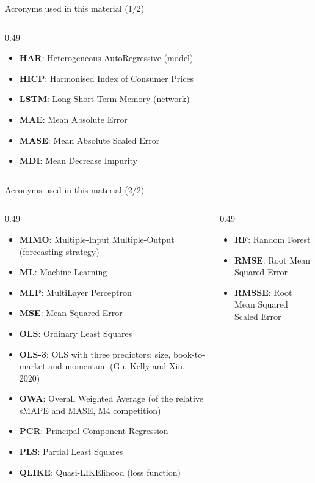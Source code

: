 \begin{frame}{Acronyms used in this material (1/2)}
\begin{columns}[T]
\begin{column}{0.49\textwidth}
\begin{itemize}
    \item \textbf{HAR}: Heterogeneous AutoRegressive (model)
    \item \textbf{HICP}: Harmonised Index of Consumer Prices
    \item \textbf{LSTM}: Long Short-Term Memory (network)
    \item \textbf{MAE}: Mean Absolute Error
    \item \textbf{MASE}: Mean Absolute Scaled Error
    \item \textbf{MDI}: Mean Decrease Impurity
\end{itemize}
\end{column}
\end{columns}
\end{frame}
\begin{frame}{Acronyms used in this material (2/2)}
\begin{columns}[T]
\begin{column}{0.49\textwidth}
\begin{itemize}\setlength{\itemsep}{0pt}
    \item \textbf{MIMO}: Multiple-Input Multiple-Output (forecasting strategy)
    \item \textbf{ML}: Machine Learning
    \item \textbf{MLP}: MultiLayer Perceptron
    \item \textbf{MSE}: Mean Squared Error
    \item \textbf{OLS}: Ordinary Least Squares
    \item \textbf{OLS-3}: OLS with three predictors: size, book-to-market and momentum (Gu, Kelly and Xiu, 2020)
    \item \textbf{OWA}: Overall Weighted Average (of the relative sMAPE and MASE, M4 competition)
    \item \textbf{PCR}: Principal Component Regression
    \item \textbf{PLS}: Partial Least Squares
    \item \textbf{QLIKE}: Quasi-LIKElihood (loss function)
\end{itemize}
\end{column}
\begin{column}{0.49\textwidth}
\begin{itemize}\setlength{\itemsep}{0pt}
    \item \textbf{RF}: Random Forest
    \item \textbf{RMSE}: Root Mean Squared Error
    \item \textbf{RMSSE}: Root Mean Squared Scaled Error

\end{itemize}
\end{column}
\end{columns}
\end{frame}
